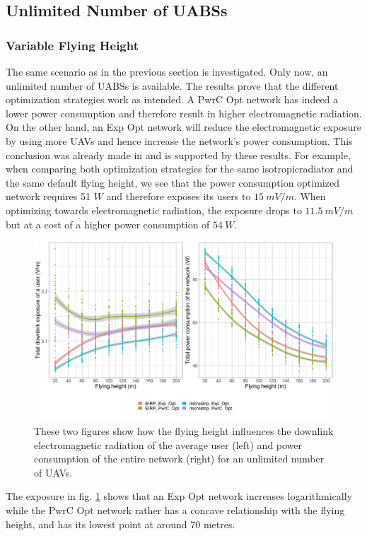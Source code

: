\documentclass[twocolumn]{phdsymp} %
\begin{document}
\subsection{Unlimited Number of UABSs}
\subsubsection{Variable Flying Height}
The same scenario as in the previous section is investigated. Only now, an unlimited number of \gls{UABS}s is available.
The results prove that the different optimization strategies work as intended.
A \gls{PwrC Opt} network has indeed a lower power consumption and therefore result in higher electromagnetic radiation.
On the other hand, an \gls{Exp Opt} network will reduce the electromagnetic exposure by using more \gls{UAV}s and hence increase the network's
power consumption. This conclusion was already made in \cite{J1} and is supported by these results.
For example, when comparing both optimization strategies for the same \gls{isotropicradiator} and the same default flying height, we see that
the power consumption optimized network requires 51 $W$ and therefore exposes its users
to $15\ mV/m$. When optimizing towards electromagnetic radiation, the exposure drops to $11.5\ mV/m$ but at a cost of a higher power consumption
of $54\ W$.
\begin{figure}[h!]
  \includegraphics[width=\linewidth]{../results/s3/fhvsdlAndPc.png}
  \caption{These two figures show how the flying height influences the downlink electromagnetic radiation of the average user (left) and 
  power consumption of the entire network (right) for an unlimited number of \gls{UAV}s.}
  \label{fig:s3a_dlAndPc}
\end{figure}

The exposure in fig. \ref{fig:s3a_dlAndPc} shows that an \gls{Exp Opt} network increases logarithmically while the \gls{PwrC Opt} network rather 
has a concave relationship with the flying height, and has its lowest point at around 70 metres.
\end{document}
